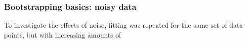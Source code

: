 \subsubsection{Bootstrapping basics: noisy data}

To investigate the effects of noise, fitting was repeated for the same set of data-points, but with increasing amounts of